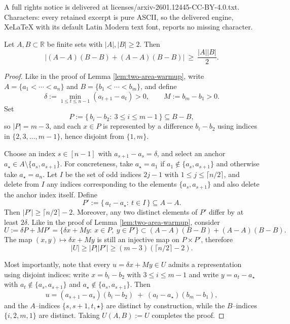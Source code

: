 \documentclass[10pt,a4paper]{amsart}
\newcommand{\RR}{\mathbb{R}}
\begin{document}
A full rights notice is delivered at licenses/arxiv-2601.12445-CC-BY-4.0.txt. Characters: every retained excerpt is pure ASCII, so the delivered engine, XeLaTeX with its default Latin Modern text font, reports no missing character.
\begin{lemma}\label{lem:two-area-warmup}
Let $A,B\subset\RR$ be finite sets with $|A|,|B| \geq 2$. Then
\[
\bigl|(A-A)(B-B)+(A-A)(B-B)\bigr|\ \ge\ \frac{|A||B|}{2}.
\]
\end{lemma}

\begin{proof}
Like in the proof of Lemma \ref{lem:two-area-warmup}, write $A=\{a_1<\cdots<a_n\}$ and $B=\{b_1<\cdots<b_m\}$, and define 
\[
\delta:=\min_{1\le t\le n-1}(a_{t+1}-a_t)>0,
\qquad
M:=b_m-b_1>0.
\]
Set
\[
P:=\{\,b_i-b_2:\ 3\le i\le m-1\,\}\subseteq B-B,
\]
so $|P|=m-3$, and each $x\in P$ is represented by a difference $b_i-b_2$ using indices in
$\{2,3,\dots,m-1\}$, hence disjoint from $\{1,m\}$.

Choose an index $s \in [n-1]$ with $a_{s+1}-a_s=\delta$, and select an anchor $a_\star\in A\setminus\{a_s,a_{s+1}\}$. For concreteness, take $a_\star=a_1$ if
$a_1\notin\{a_s,a_{s+1}\}$ and otherwise take $a_\star=a_n$.  Let $I$ be the set of odd indices
$2j-1$ with $1\le j\le\lceil n/2\rceil$, and delete from $I$ any indices corresponding to the elements $\{a_s,a_{s+1}\}$ and also delete the anchor index itself.
Define
\[
P':=\{\,a_t-a_\star:\ t\in I\,\}\subseteq A-A.
\]
Then $|P'|\ge \lceil n/2\rceil-2$.  Moreover, any two distinct elements of $P'$ differ by at least
$2\delta$. Like in the proof of Lemma \ref{lem:two-area-warmup}, consider
\[
U:=\delta P+MP'=\{\delta x+My:\ x\in P,\ y\in P'\} \subset (A-A)(B-B)+(A-A)(B-B).
\]
The map $(x,y)\mapsto \delta x+My$ is still an injective map on $P\times P'$, therefore 
$$|U| \geq |P||P'|\ge (m-3)(\lceil n/2\rceil-2).$$

Most importantly, note that every $u=\delta x+My\in U$ admits a representation using disjoint indices: write
$x=b_i-b_2$ with $3\le i\le m-1$ and write $y=a_t-a_\star$ with $a_t\notin\{a_s,a_{s+1}\}$ and
$a_\star\notin\{a_s,a_{s+1}\}$.  Then
\[
u=(a_{s+1}-a_s)(b_i-b_2)\;+\;(a_t-a_\star)(b_m-b_1),
\]
and the $A$--indices $\{s,s+1,t,\star\}$ are distinct by construction, while the $B$--indices
$\{i,2,m,1\}$ are distinct.  Taking $U(A,B):=U$ completes the proof.
\end{proof}
\end{document}
